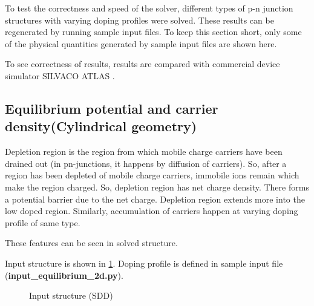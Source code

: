To test the correctness and speed of the solver, different types of p-n junction structures with varying doping profiles were solved. These results can be regenerated by running sample input files. To keep this section short, only some of the physical quantities generated by sample input files are shown here. 

To see correctness of results, results are compared with commercial device simulator SILVACO ATLAS \cite{atlas}. 

\subsection{Equilibrium potential and carrier density(Cylindrical geometry)}
Depletion region is the region from which mobile charge carriers have been drained out (in pn-junctions, it happens by diffusion of carriers). So, after a region has been depleted of mobile charge carriers, immobile ions remain which make the region charged. So, depletion region has net charge density. There forms a potential barrier due to the net charge. Depletion region extends more into the low doped region.
Similarly, accumulation of carriers happen at varying doping profile of same type. 

These features can be seen in solved structure.

Input structure is shown in \ref{fig:SDD}. Doping profile is defined in sample input file (\textbf{input\_equilibrium\_2d.py}). 

\begin{figure}[h!]
\caption{Input structure (SDD)}
\label{fig:SDD}
\end{figure}


